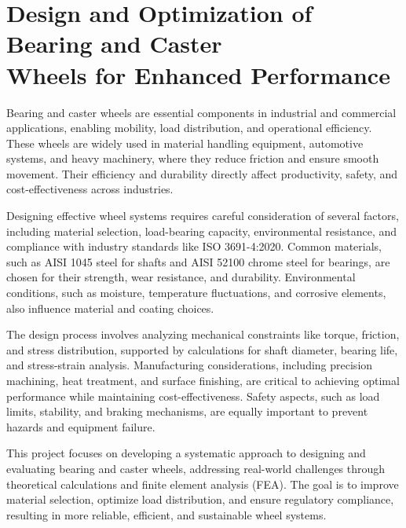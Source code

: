 \documentclass[../../main]{subfiles}
\begin{document}
\section{Design and Optimization of Bearing and Caster\\ Wheels for Enhanced Performance}

Bearing and caster wheels are essential components in industrial and commercial applications, enabling mobility, load distribution, and operational efficiency. These wheels are widely used in material handling equipment, automotive systems, and heavy machinery, where they reduce friction and ensure smooth movement. Their efficiency and durability directly affect productivity, safety, and cost-effectiveness across industries.

Designing effective wheel systems requires careful consideration of several factors, including material selection, load-bearing capacity, environmental resistance, and compliance with industry standards like ISO 3691-4:2020. Common materials, such as AISI 1045 steel for shafts and AISI 52100 chrome steel for bearings, are chosen for their strength, wear resistance, and durability. Environmental conditions, such as moisture, temperature fluctuations, and corrosive elements, also influence material and coating choices.

The design process involves analyzing mechanical constraints like torque, friction, and stress distribution, supported by calculations for shaft diameter, bearing life, and stress-strain analysis. Manufacturing considerations, including precision machining, heat treatment, and surface finishing, are critical to achieving optimal performance while maintaining cost-effectiveness. Safety aspects, such as load limits, stability, and braking mechanisms, are equally important to prevent hazards and equipment failure.

This project focuses on developing a systematic approach to designing and evaluating bearing and caster wheels, addressing real-world challenges through theoretical calculations and finite element analysis (FEA). The goal is to improve material selection, optimize load distribution, and ensure regulatory compliance, resulting in more reliable, efficient, and sustainable wheel systems.


\end{document}

